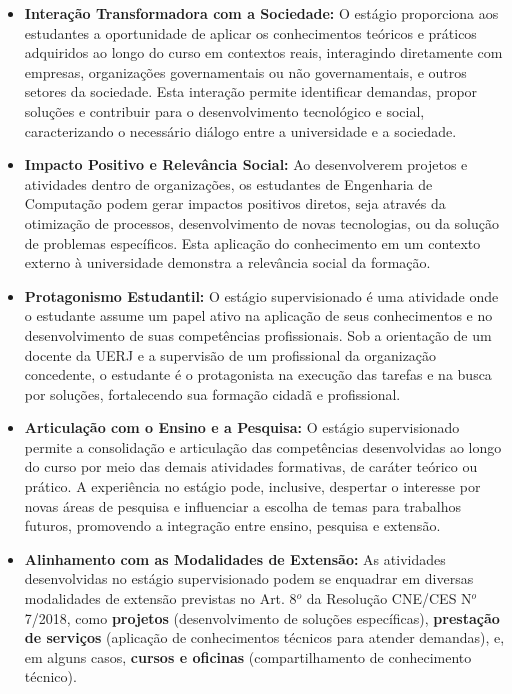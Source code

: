 \begin{itemize}
    \item \textbf{Interação Transformadora com a Sociedade:} O estágio proporciona aos estudantes a oportunidade de aplicar os conhecimentos teóricos e práticos adquiridos ao longo do curso em contextos reais, interagindo diretamente com empresas, organizações governamentais ou não governamentais, e outros setores da sociedade. Esta interação permite identificar demandas, propor soluções e contribuir para o desenvolvimento tecnológico e social, caracterizando o necessário diálogo entre a universidade e a sociedade.
    \item \textbf{Impacto Positivo e Relevância Social:} Ao desenvolverem projetos e atividades dentro de organizações, os estudantes de Engenharia de Computação podem gerar impactos positivos diretos, seja através da otimização de processos, desenvolvimento de novas tecnologias, ou da solução de problemas específicos. Esta aplicação do conhecimento em um contexto externo à universidade demonstra a relevância social da formação.
    \item   \textbf{Protagonismo Estudantil: }O estágio supervisionado é uma atividade onde o estudante assume um papel ativo na aplicação de seus conhecimentos e no desenvolvimento de suas competências profissionais. Sob a orientação de um docente da UERJ e a supervisão de um profissional da organização concedente, o estudante é o protagonista na execução das tarefas e na busca por soluções, fortalecendo sua formação cidadã e profissional.
    \item  \textbf{Articulação com o Ensino e a Pesquisa: }O estágio supervisionado permite a consolidação e articulação das competências desenvolvidas ao longo do curso por meio das demais atividades formativas, de caráter teórico ou prático. A experiência no estágio pode, inclusive, despertar o interesse por novas áreas de pesquisa e influenciar a escolha de temas para trabalhos futuros, promovendo a integração entre ensino, pesquisa e extensão.
    \item  \textbf{Alinhamento com as Modalidades de Extensão:} As atividades desenvolvidas no estágio supervisionado podem se enquadrar em diversas modalidades de extensão previstas no Art. 8$^o$ da Resolução CNE/CES N$^o$ 7/2018, como \textbf{projetos} (desenvolvimento de soluções específicas), \textbf{prestação de serviços} (aplicação de conhecimentos técnicos para atender demandas), e, em alguns casos, \textbf{cursos e oficinas }(compartilhamento de conhecimento técnico).
\end{itemize}
